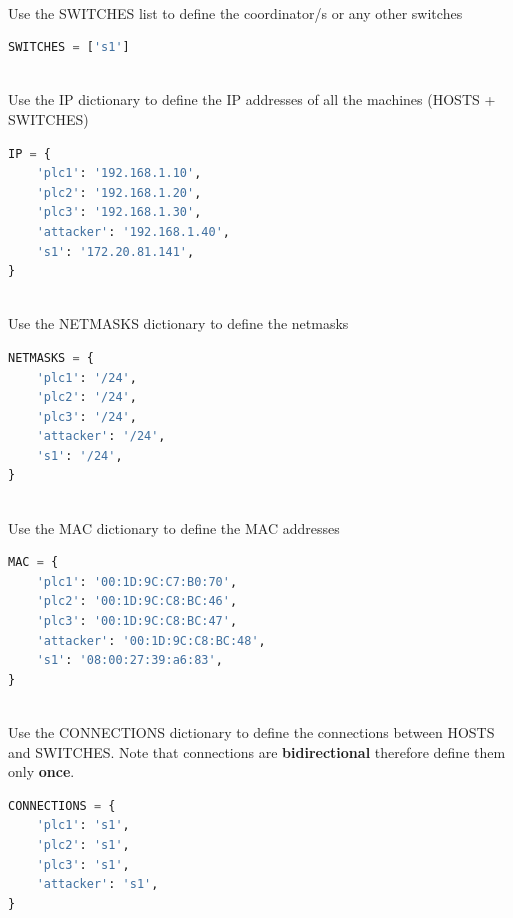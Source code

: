 \documentclass[book,a4paper,12pt,oneside]{memoir}
\begin{document}
\noindent \\ Use the SWITCHES list to define the coordinator/s or any other switches

\begin{lstlisting}[backgroundcolor = \color{ultralightgray}, language = Python, xleftmargin = 0.1cm, framexleftmargin = 0.3em, showstringspaces=false]
SWITCHES = ['s1']
\end{lstlisting}


\noindent \\ Use the IP dictionary to define the IP addresses of all the machines (HOSTS + SWITCHES)

\begin{lstlisting}[backgroundcolor = \color{ultralightgray}, language = Python, xleftmargin = 0.1cm, framexleftmargin = 0.3em, showstringspaces=false]
IP = {
    'plc1': '192.168.1.10',
    'plc2': '192.168.1.20',
    'plc3': '192.168.1.30',
    'attacker': '192.168.1.40',
    's1': '172.20.81.141',
}
\end{lstlisting}


\noindent \\ Use the NETMASKS dictionary to define the netmasks

\begin{lstlisting}[backgroundcolor = \color{ultralightgray}, language = Python, xleftmargin = 0.1cm, framexleftmargin = 0.3em, showstringspaces=false]
NETMASKS = {
    'plc1': '/24',
    'plc2': '/24',
    'plc3': '/24',
    'attacker': '/24',
    's1': '/24',
}
\end{lstlisting}


\noindent \\ Use the MAC dictionary to define the MAC addresses

\begin{lstlisting}[backgroundcolor = \color{ultralightgray}, language = Python, xleftmargin = 0.1cm, framexleftmargin = 0.3em, showstringspaces=false]
MAC = {
    'plc1': '00:1D:9C:C7:B0:70',
    'plc2': '00:1D:9C:C8:BC:46',
    'plc3': '00:1D:9C:C8:BC:47',
    'attacker': '00:1D:9C:C8:BC:48',
    's1': '08:00:27:39:a6:83',
}
\end{lstlisting}


\noindent \\ Use the CONNECTIONS dictionary to define the connections between HOSTS and SWITCHES.  Note that connections are \textbf{bidirectional} therefore define them only \textbf{once}.

\begin{lstlisting}[backgroundcolor = \color{ultralightgray}, language = Python, xleftmargin = 0.1cm, framexleftmargin = 0.3em, showstringspaces=false]
CONNECTIONS = {
    'plc1': 's1',
    'plc2': 's1',
    'plc3': 's1',
    'attacker': 's1',
}
\end{lstlisting}
\end{document}
